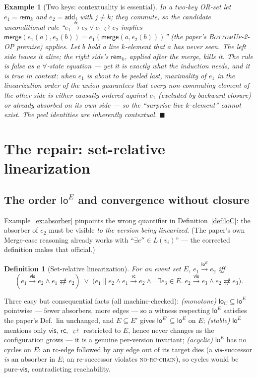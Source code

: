 \documentclass[11pt]{article}
\newtheorem{definition}[theorem]{Definition}
\newtheorem{example}[theorem]{Example}
\newcommand{\vis}{\xrightarrow{\mathsf{vis}}}
\newcommand{\rc}{\xrightarrow{\mathsf{rc}}}
\newcommand{\comm}{\rightleftarrows}
\newcommand{\ncomm}{\not\rightleftarrows}
\newcommand{\add}{\mathsf{add}}
\newcommand{\rem}{\mathsf{rem}}
\newcommand{\Merge}{\mathsf{merge}}
\newcommand{\loE}[1]{\mathsf{lo}^{#1}}
\begin{document}
\begin{example}[Two keys: contextuality is essential]
\label{ex:twokey}
In a two-key OR-set let $e_1 = \rem_k$ and $e_2 = \add_j$ with
$j \neq k$; they \emph{commute}, so the candidate unconditional rule
``$e_1 \rc e_2 \vee e_1 \comm e_2$ implies
$\Merge(e_1(a), e_2(b)) = e_1(\Merge(a, e_2(b)))$''
(the paper's \textsc{BottomUp-2-OP} premise) applies. Let $b$ hold a live
$k$-element that $a$ has never seen. The left side leaves it alive; the
right side's $\rem_k$, applied after the merge, kills it. The rule is
false as a $\forall$-state equation --- \emph{yet it is exactly what the
induction needs, and it is true in context}: when $e_1$ is about to be
peeled \emph{last}, maximality of $e_1$ in the linearization order of the
\emph{union} guarantees that every non-commuting element of the other
side is either causally ordered against $e_1$ (excluded by backward
closure) or already absorbed on its own side --- so the ``surprise live
$k$-element'' cannot exist. The peel identities are inherently
\emph{contextual}. \hfill$\blacksquare$
\end{example}

\section{The repair: set-relative linearization}
\label{sec:repair}

\subsection{The order $\loE{E}$ and convergence without closure}

Example~\ref{ex:absorber} pinpoints the wrong quantifier in
Definition~\ref{def:loC}: the absorber of $e_2$ must be visible \emph{to
the version being linearized}. (The paper's own Merge-case reasoning
already works with ``$\exists e'' \in L(v_i)$'' --- the corrected
definition makes that official.)

\begin{definition}[Set-relative linearization]
\label{def:loE}
For an event set $E$,\; $e_1 \xrightarrow{\loE{E}} e_2$ iff
\[
(e_1 \vis e_2 \wedge e_1 \ncomm e_2)
\;\vee\;
\bigl(e_1 \parallel e_2 \wedge e_1 \rc e_2 \wedge
\neg\exists e_3 \in E.\; e_2 \vis e_3 \wedge e_2 \ncomm e_3\bigr).
\]
\end{definition}

Three easy but consequential facts (all machine-checked):
\emph{(monotone)} $\mathsf{lo}_C \subseteq \loE{E}$ pointwise --- fewer
absorbers, more edges --- so a witness respecting $\loE{E}$ satisfies the
paper's Def.~lin unchanged, and $E \subseteq E'$ gives
$\loE{E'} \subseteq \loE{E}$ on $E$;
\emph{(stable)} $\loE{E}$ mentions only $\mathsf{vis}$, $\mathsf{rc}$,
$\comm$ restricted to $E$, hence never changes as the configuration
grows --- it is a genuine per-version invariant;
\emph{(acyclic)} $\loE{E}$ has no cycles on $E$: an rc-edge followed by
any edge out of its target dies (a $\mathsf{vis}$-successor \emph{is} an
absorber in $E$; an rc-successor violates \textsc{no-rc-chain}), so
cycles would be pure-$\mathsf{vis}$, contradicting reachability.
\end{document}
